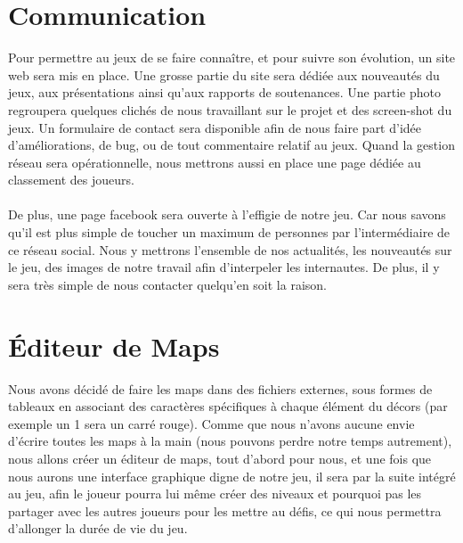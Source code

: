 \documentclass [11pt]{report}
\begin{document}
	\section {Communication}
		Pour permettre au jeux de se faire conna\^itre, et pour suivre son \'evolution, un site web sera mis en place. Une grosse partie du site sera dédiée aux nouveautés du jeux, aux présentations ainsi qu'aux rapports de soutenances. Une partie photo regroupera quelques clichés de nous travaillant sur le projet et des screen-shot du 		jeux. Un formulaire de contact sera disponible afin de nous faire part d'idée d'am\'eliorations, de bug, ou de tout commentaire relatif au jeux. Quand la gestion réseau sera opérationnelle, nous mettrons aussi en place une page dédiée au classement des joueurs.
	\\
	\\
	 \indent De plus, une page facebook sera ouverte à l'effigie de notre jeu. Car nous savons qu'il est plus simple de toucher un maximum de personnes par l'intermédiaire de ce réseau social. Nous y mettrons l'ensemble de nos actualités, les nouveautés sur le jeu, des images de notre travail afin d'interpeler les internautes. De plus, il y sera 		très simple de nous contacter quelqu'en soit la raison.

	\section {\'Editeur de Maps}
		Nous avons décidé de faire les maps dans des fichiers externes, sous formes de tableaux en associant des caractères spécifiques à chaque élément du décors (par exemple un 1 sera un carré rouge). Comme que nous n'avons aucune envie d'écrire toutes les maps à la main (nous pouvons perdre notre temps autrement), nous 		allons créer un éditeur de maps, tout d'abord pour nous, et une fois que nous aurons une interface graphique digne de notre jeu, il sera par la suite intégré au jeu, afin le joueur pourra lui même créer des niveaux et pourquoi pas les partager avec les autres joueurs pour les mettre au défis, ce qui nous permettra d'allonger la durée de 		vie du jeu.\\\vspace{5mm}


\newpage
\end{document}
